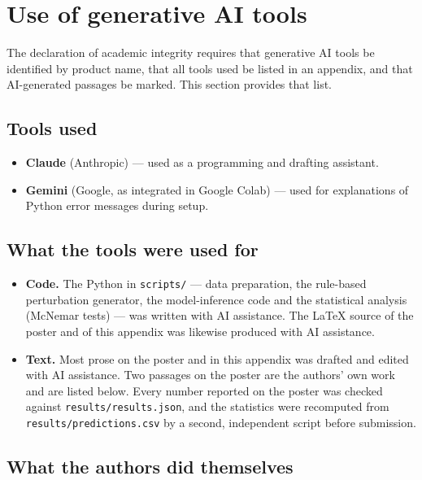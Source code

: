 \documentclass[11pt,a4paper]{article}
\begin{document}
\newpage

\section{Use of generative AI tools}

The declaration of academic integrity requires that generative AI tools be identified
by product name, that all tools used be listed in an appendix, and that AI-generated
passages be marked. This section provides that list.

\subsection*{Tools used}

\begin{itemize}
  \item \textbf{Claude} (Anthropic) --- used as a programming and drafting assistant.
  \item \textbf{Gemini} (Google, as integrated in Google Colab) --- used for explanations of Python error messages during setup.
\end{itemize}

\subsection*{What the tools were used for}

\begin{itemize}
  \item \textbf{Code.} The Python in \texttt{scripts/} --- data preparation, the rule-based
        perturbation generator, the model-inference code and the statistical analysis
        (McNemar tests) --- was written with AI assistance. The \LaTeX{} source of the
        poster and of this appendix was likewise produced with AI assistance.
  \item \textbf{Text.} Most prose on the poster and in this appendix was drafted and edited
        with AI assistance. Two passages on the poster are the authors' own work and are
        listed below. Every number reported on the poster was checked against
        \texttt{results/results.json}, and the statistics were recomputed from
        \texttt{results/predictions.csv} by a second, independent script before submission.
\end{itemize}

\subsection*{What the authors did themselves}
\end{document}
